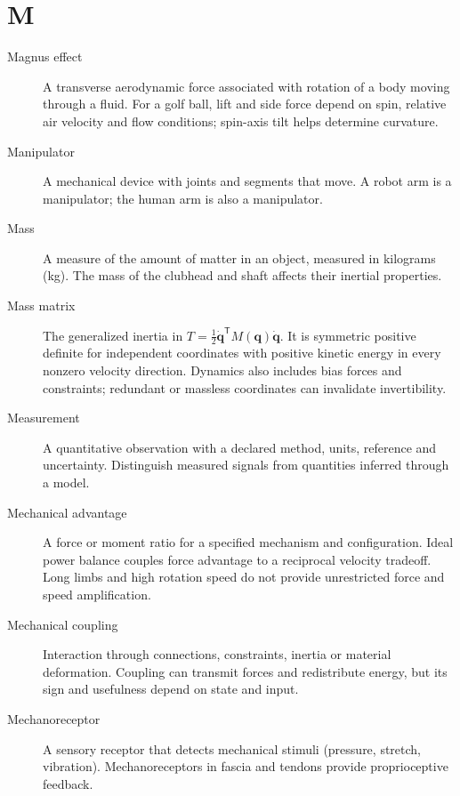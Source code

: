 \section*{M}
\begin{description}

\item[Magnus effect] A transverse aerodynamic force associated with rotation of a body moving through a fluid. For a golf ball, lift and side force depend on spin, relative air velocity and flow conditions; spin-axis tilt helps determine curvature.

\item[Manipulator] A mechanical device with joints and segments that move. A robot arm is a manipulator; the human arm is also a manipulator.

\item[Mass] A measure of the amount of matter in an object, measured in kilograms (kg). The mass of the clubhead and shaft affects their inertial properties.

\item[Mass matrix] The generalized inertia in $T=\tfrac12\dot{\mathbf{q}}^\mathsf{T}M(\mathbf{q})\dot{\mathbf{q}}$. It is symmetric positive definite for independent coordinates with positive kinetic energy in every nonzero velocity direction. Dynamics also includes bias forces and constraints; redundant or massless coordinates can invalidate invertibility.

\item[Measurement] A quantitative observation with a declared method, units, reference and uncertainty. Distinguish measured signals from quantities inferred through a model.

\item[Mechanical advantage] A force or moment ratio for a specified mechanism and configuration. Ideal power balance couples force advantage to a reciprocal velocity tradeoff. Long limbs and high rotation speed do not provide unrestricted force and speed amplification.

\item[Mechanical coupling] Interaction through connections, constraints, inertia or material deformation. Coupling can transmit forces and redistribute energy, but its sign and usefulness depend on state and input.

\item[Mechanoreceptor] A sensory receptor that detects mechanical stimuli (pressure, stretch, vibration). Mechanoreceptors in fascia and tendons provide proprioceptive feedback.


\end{description}
